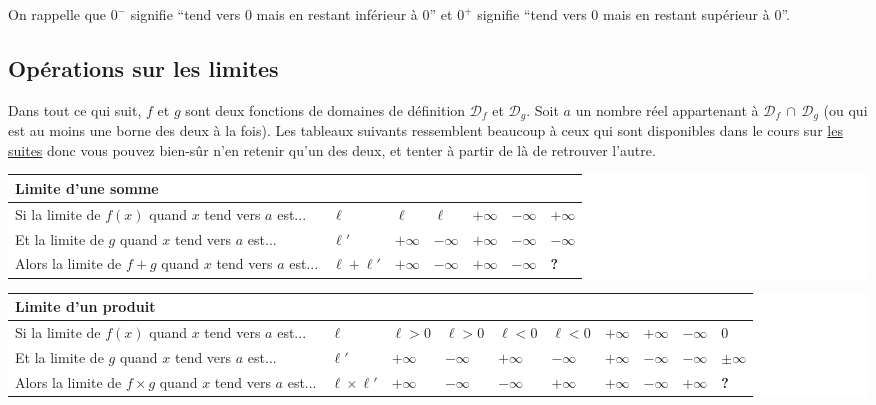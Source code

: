 	\begin{tip}[Rappel]
		On rappelle que $0^-$ signifie ``tend vers $0$ mais en restant inférieur à $0$'' et $0^+$ signifie ``tend vers $0$ mais en restant supérieur à $0$''.
	\end{tip}
	
	\subsection{Opérations sur les limites}
	
	Dans tout ce qui suit, $f$ et $g$ sont deux fonctions de domaines de définition $\mathcal{D}_f$ et $\mathcal{D}_g$. Soit $a$ un nombre réel appartenant à $\mathcal{D}_f \, \cap \, \mathcal{D}_g$ (ou qui est au moins une borne des deux à la fois). Les tableaux suivants ressemblent beaucoup à ceux qui sont disponibles dans le cours sur \href{https://bacomathiqu.es/cours/terminale/suites/}{les suites} donc vous pouvez bien-sûr n'en retenir qu'un des deux, et tenter à partir de là de retrouver l'autre.
	
	\medskip
	\begin{formula}
		\colorbox{white}{%
			\begin{tabularx}{\textwidth}{|X|l|l|l|l|l|l|}
				\hline
				\multicolumn{7}{|l|}{\textbf{Limite d'une somme}} \\
				\hline
				Si la limite de $f(x)$ quand $x$ tend vers $a$ est... & $\ell$ & $\ell$ & $\ell$ & $+\infty$ & $-\infty$ & $+\infty$ \\
				\hline
				Et la limite de $g$ quand $x$ tend vers $a$ est... & $\ell'$ & $+\infty$ & $-\infty$ & $+\infty$ & $-\infty$ & $-\infty$ \\
				\hline
				Alors la limite de $f + g$ quand $x$ tend vers $a$ est... & $\ell + \ell'$ & $+\infty$ & $-\infty$ & $+\infty$ & $-\infty$ & \textbf{?} \\
				\hline
			\end{tabularx}%
		}
	\end{formula}
	
	\begin{formula}
		\colorbox{white}{%
			\begin{tabularx}{\textwidth}{|X|l|l|l|l|l|l|l|l|l|}
				\hline
				\multicolumn{10}{|l|}{\textbf{Limite d'un produit}} \\
				\hline
				Si la limite de $f(x)$ quand $x$ tend vers $a$ est... & $\ell$ & $\ell \gt 0$ & $\ell \gt 0$ & $\ell \lt 0$ & $\ell \lt 0$ & $+\infty$ & $+\infty$ & $-\infty$ & $0$ \\
				\hline
				Et la limite de $g$ quand $x$ tend vers $a$ est... & $\ell'$ & $+\infty$ & $-\infty$ & $+\infty$ & $-\infty$ & $+\infty$ & $-\infty$ & $-\infty$ & $\pm \infty$ \\
				\hline
				Alors la limite de $f \times g$ quand $x$ tend vers $a$ est... & $\ell \times \ell'$ & $+\infty$ & $-\infty$ & $-\infty$ & $+\infty$ & $+\infty$ & $-\infty$ & $+\infty$ & \textbf{?} \\
				\hline
			\end{tabularx}%
		}
	\end{formula}
	
